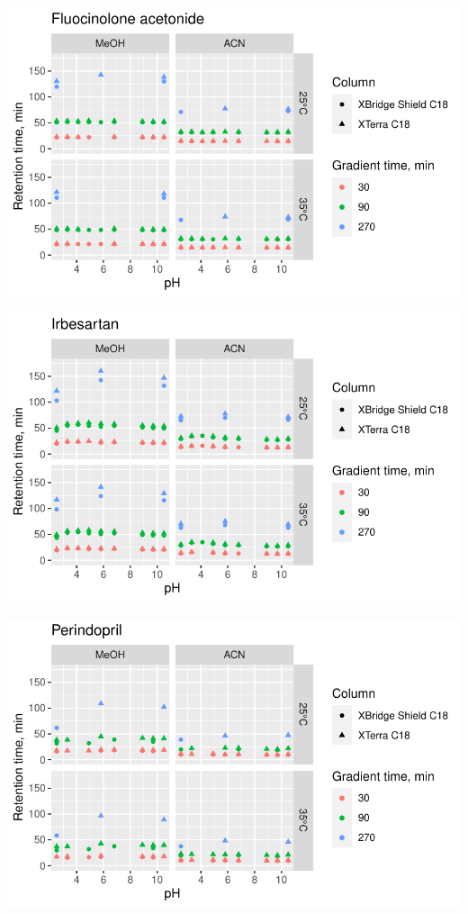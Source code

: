 \documentclass[
  letterpaper,
  DIV=11,
  numbers=noendperiod]{scrreprt}
\begin{document}
\includegraphics{index_files/figure-pdf/unnamed-chunk-4-183.pdf}

\includegraphics{index_files/figure-pdf/unnamed-chunk-4-184.pdf}

\includegraphics{index_files/figure-pdf/unnamed-chunk-4-185.pdf}
\end{document}
